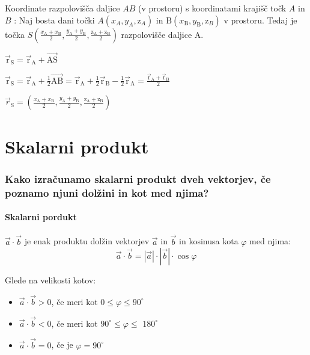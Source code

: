 \documentclass{article}
\begin{document}
Koordinate razpolovišča daljice $A B$ (v prostoru) s koordinatami krajišč točk $A$ in $B$ : Naj bosta dani točki $A\left(x_{A}, y_{A}, \mathrm{z}_{A}\right)$ in $\mathrm{B}\left(x_{\mathrm{B}}, y_{\mathrm{B}}, \mathrm{z}_{B}\right)$ v prostoru. Tedaj je točka $S\left(\frac{x_{\mathrm{A}}+x_{\mathrm{B}}}{2}, \frac{y_{\mathrm{A}}+y_{\mathrm{B}}}{2}, \frac{\mathrm{z}_{\mathrm{A}}+\mathrm{z}_{\mathrm{B}}}{2}\right)$ razpolovišče daljice $\mathrm{A}$.


$\overrightarrow{\mathrm{r}}_{\mathrm{S}}=\overrightarrow{\mathrm{r}}_{\mathrm{A}}+\overrightarrow{\mathrm{AS}}$

$\overrightarrow{\mathrm{r}}_{\mathrm{S}}=\overrightarrow{\mathrm{r}}_{\mathrm{A}}+\frac{1}{2} \overrightarrow{\mathrm{AB}}=\overrightarrow{\mathrm{r}}_{\mathrm{A}}+\frac{1}{2} \overrightarrow{\mathrm{r}}_{\mathrm{B}}-\frac{1}{2} \overrightarrow{\mathrm{r}}_{\mathrm{A}}=\frac{\overrightarrow{\mathrm{r}}_{\mathrm{A}}+\overrightarrow{\mathrm{r}}_{\mathrm{B}}}{2}$

$\overrightarrow{r}_{\mathrm{S}}=\left(\frac{x_{\mathrm{A}}+x_{\mathrm{B}}}{2}, \frac{y_{\mathrm{A}}+y_{\mathrm{B}}}{2}, \frac{\mathrm{z}_{\mathrm{A}}+\mathrm{z}_{\mathrm{B}}}{2}\right)$

\section{Skalarni produkt}
\subsubsection*{Kako izračunamo skalarni produkt dveh vektorjev, če poznamo njuni dolžini in kot med njima?}

\paragraph{Skalarni pordukt} $\vec{a} \cdot \vec{b}$ je enak produktu dolžin vektorjev $\vec{a}$ in $\vec{b}$ in kosinusa kota $\varphi$ med njima: 
$$
\overrightarrow{a} \cdot \overrightarrow{b}=|\overrightarrow{a}| \cdot|\overrightarrow{b}| \cdot \cos \varphi
$$

Glede na velikosti kotov: 
\begin{itemize}
    \item $\vec{a} \cdot \vec{b}>0$, če meri kot $0 \leq \varphi \leq 90^{\circ}$
    \item $\vec{a} \cdot \vec{b}<0$, če meri kot $90^{\circ} \leq \varphi \leq$ $180^{\circ}$
    \item $\vec{a} \cdot \vec{b}=0$, če je $\varphi=90^{\circ}$
\end{itemize}
\end{document}
